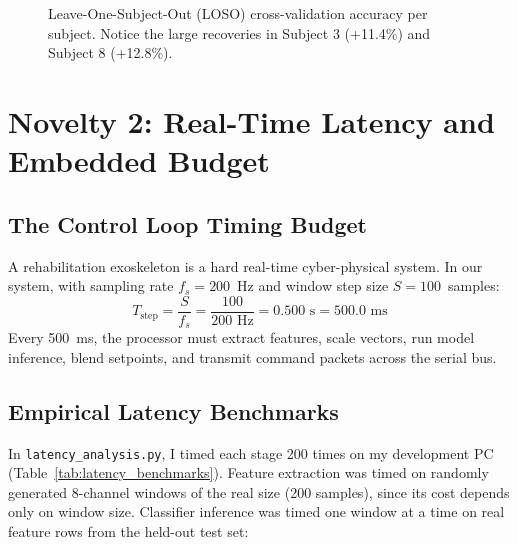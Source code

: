 \documentclass[11pt,a4paper]{article}
\begin{document}
\begin{figure}[htbp]
\centering
{}
\caption{Leave-One-Subject-Out (LOSO) cross-validation accuracy per subject. Notice the large recoveries in Subject 3 (+11.4\%) and Subject 8 (+12.8\%).}
\label{fig:loso_chart}
\end{figure}

\section{Novelty 2: Real-Time Latency and Embedded Budget}

\subsection{The Control Loop Timing Budget}
A rehabilitation exoskeleton is a hard real-time cyber-physical system. In our system, with sampling rate $f_s = 200$~Hz and window step size $S = 100$~samples:
\begin{equation}
    T_{\text{step}} = \frac{S}{f_s} = \frac{100}{200\text{ Hz}} = 0.500\text{ s} = 500.0\text{ ms}
\end{equation}
Every 500~ms, the processor must extract features, scale vectors, run model inference, blend setpoints, and transmit command packets across the serial bus.

\subsection{Empirical Latency Benchmarks}
In \texttt{latency\_analysis.py}, I timed each stage 200 times on my development PC (Table~\ref{tab:latency_benchmarks}). Feature extraction was timed on randomly generated 8-channel windows of the real size (200 samples), since its cost depends only on window size. Classifier inference was timed one window at a time on real feature rows from the held-out test set:
\end{document}
